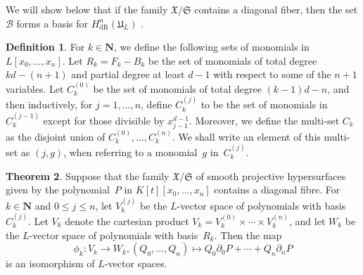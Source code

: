 \documentclass[a4paper,11pt]{article}
\numberwithin{equation}{section}
\newcommand{\NN}{\mathbf{N}} %
\renewcommand{\to}{\rightarrow}        %
\providecommand{\HdR}{H_{\text{dR}}}    %
\providecommand{\cB}{\mathcal{B}} %
\theoremstyle{definition}
\newtheorem{thm}{Theorem}[section]
\newtheorem{defn}[thm]{Definition}
\begin{document}

We will show below that if the family $\mathfrak{X}/{\mathfrak{S}}$ contains a diagonal fiber, 
then the set $\cB$ forms a basis for $\HdR^n(\mathfrak{U}_L)$ .

\begin{defn} \label{defn:IndexSets}
For $k \in \NN$, we define the following sets of monomials in 
$L[x_0, \dotsc, x_n]$.  Let $R_k = F_k - B_k$ be the set of monomials of 
total degree $kd-(n+1)$ and partial degree at least $d-1$ with respect to some 
of the $n+1$ variables.  Let $C_k^{(0)}$ be the set of monomials of total 
degree $(k-1)d - n$, and then inductively, for $j = 1, \dotsc, n$, define 
$C_k^{(j)}$ to be the set of monomials in $C_k^{(j-1)}$ except for those 
divisible by $x_{j-1}^{d-1}$.  Moreover, we define the multi-set $C_k$ as 
the disjoint union of $C_k^{(0)}, \dotsc, C_k^{(n)}$.  We shall write an 
element of this multi-set as $(j, g)$, when referring to a monomial~$g$ 
in~$C_k^{(j)}$.
\end{defn}

\begin{thm} \label{thm:Isomorphism}
Suppose that the family $\mathfrak{X}/\mathfrak{S}$ of smooth projective
hypersurfaces given by the polynomial~$P$ in $K[t][x_0, \dotsc, x_n]$ contains 
a diagonal fibre.  For $k \in \NN$ and $0 \leq j \leq n$, let $V_k^{(j)}$ be 
the $L$-vector space of polynomials with basis $C_k^{(j)}$. Let $V_k$ denote the 
cartesian product $V_k = V_k^{(0)} \times \dotsb \times V_k^{(n)}$, and let $W_k$ be 
the $L$-vector space of polynomials with basis~$R_k$.  Then the map 
\begin{equation}
\phi_k \colon V_k \to W_k, 
(Q_0, \dotsc, Q_n) \mapsto Q_0 \partial_0 P + \dotsb + Q_n \partial_n P
\end{equation}
is an isomorphism of $L$-vector spaces.
\end{thm}
\end{document}
